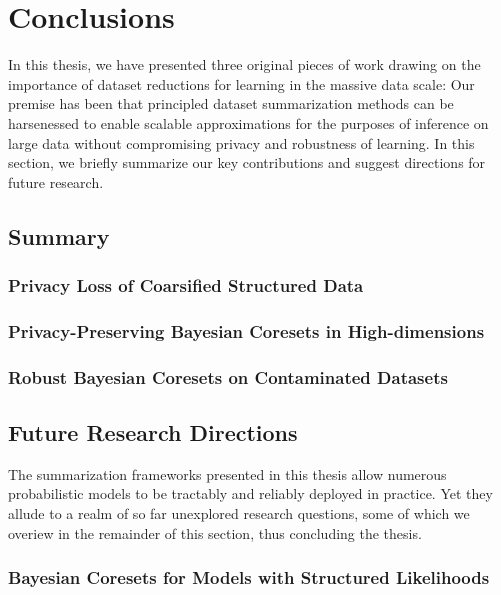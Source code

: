 \chapter{Conclusions}
\label{chap:chap6}
\renewcommand*{\MyPath}{../Chapter6}%
\newcommand{\etal}{\textit{et al}.}
\newcommand{\ie}{\textit{i}.\textit{e}.}

In this thesis, we have presented three original pieces of work drawing on the importance of dataset reductions for learning in the massive data scale: Our premise has been that principled dataset summarization methods can be harsenessed to enable scalable approximations for the purposes of inference on large data without compromising privacy and robustness of learning.
In this section, we briefly summarize our key contributions and suggest directions for future research.

\section{Summary}
\label{sec:summary}

\subsection{Privacy Loss of Coarsified Structured Data}
\label{subsec:ch3-summary}


\subsection{Privacy-Preserving Bayesian Coresets in High-dimensions}
\label{subsec:ch4-summary}

\subsection{Robust Bayesian Coresets on Contaminated Datasets}
\label{subsec:ch4-summary}


\section{Future Research Directions}
\label{sec:future-research-directions}
The summarization frameworks presented in this thesis allow numerous probabilistic models to be tractably and reliably deployed in practice. Yet they allude to a realm of so far unexplored research questions, some of which we overiew in the remainder of this section, thus concluding the thesis.

\subsection{Bayesian Coresets for Models with Structured Likelihoods}
\label{subsec:structure-liks}

